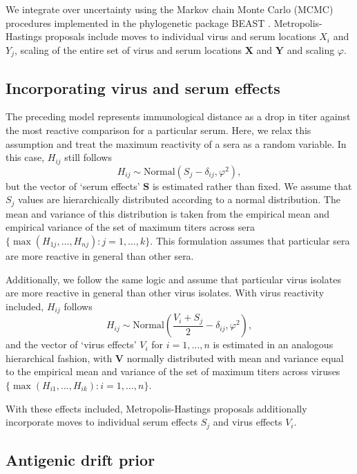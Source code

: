 \documentclass[11pt,oneside,letterpaper]{article}
\newcommand{\mdssd}{\varphi}						%
\newcommand{\vn}{n}									%
\newcommand{\sn}{k}									%
\begin{document}
We integrate over uncertainty using the Markov chain Monte Carlo (MCMC) procedures implemented in the phylogenetic package BEAST \cite{BEAST,BEAST17}.
Metropolis-Hastings proposals include moves to individual virus and serum locations $X_i$ and $Y_j$, scaling of the entire set of virus and serum locations $\mathbf{X}$ and $\mathbf{Y}$ and scaling $\mdssd$.

\subsection*{Incorporating virus and serum effects}

The preceding model represents immunological distance as a drop in titer against the most reactive comparison for a particular serum.  
Here, we relax this assumption and treat the maximum reactivity of a sera as a random variable.
In this case, $H_{ij}$ still follows
\begin{equation} 
	H_{ij} \sim \mbox{Normal}( S_j - \delta_{ij}, \mdssd^2 ),
\end{equation}
but the vector of `serum effects' $\mathbf{S}$ is estimated rather than fixed.
We assume that $S_j$ values are hierarchically distributed according to a normal distribution.
The mean and variance of this distribution is taken from the empirical mean and empirical variance of the set of maximum titers across sera $\{ \max ( H_{1j},\ldots,H_{\vn j} ) : j = 1,\ldots,\sn \}$.
This formulation assumes that particular sera are more reactive in general than other sera.

Additionally, we follow the same logic and assume that particular virus isolates are more reactive in general than other virus isolates.
With virus reactivity included, $H_{ij}$ follows
\begin{equation} 
	H_{ij} \sim \mbox{Normal}\left(  \frac{V_i+S_j}{2} - \delta_{ij}, \mdssd^2 \right),
\end{equation}
and the vector of `virus effects' $V_i$ for $i = 1,\ldots, \vn$ is estimated in an analogous hierarchical fashion, with $\mathbf{V}$ normally distributed with mean and variance equal to the empirical mean and variance of the set of maximum titers across viruses $\{ \max ( H_{i1},\ldots,H_{i \sn} ) : i = 1,\ldots,\vn \}$.

With these effects included, Metropolis-Hastings proposals additionally incorporate moves to individual serum effects $S_j$ and virus effects $V_i$.

\subsection*{Antigenic drift prior}
\end{document}
